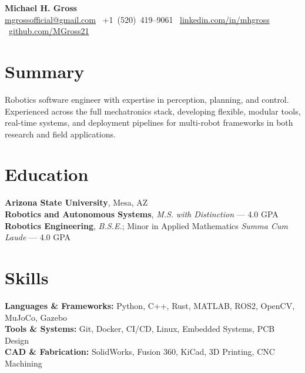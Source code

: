 \documentclass[10pt]{article}
\begin{document}

\begin{center}
    {\LARGE \textbf{Michael H. Gross}} \\
    \href{mailto:mgrossofficial@gmail.com}{mgrossofficial@gmail.com} \textbar\ +1~(520)~419--9061 \textbar\ 
    \href{https://www.linkedin.com/in/mhgross}{linkedin.com/in/mhgross} \textbar\ \href{https://github.com/MGross21}{github.com/MGross21}
\end{center}

\section*{Summary}
Robotics software engineer with expertise in perception, planning, and control. Experienced across the full mechatronics stack, developing flexible, modular tools, real-time systems, and deployment pipelines for multi-robot frameworks in both research and field applications. %

\section*{Education}
\textbf{Arizona State University}, Mesa, AZ \\
\textbf{Robotics and Autonomous Systems}, \textit{M.S.} \hfill \textit{with Distinction} --- 4.0 GPA \\
\textbf{Robotics Engineering}, \textit{B.S.E.}; Minor in Applied Mathematics \hfill \textit{Summa Cum Laude} --- 4.0 GPA

\section*{Skills}
\textbf{Languages \& Frameworks:} Python, C++, Rust, MATLAB, ROS2, OpenCV, MuJoCo, Gazebo \\
\textbf{Tools \& Systems:} Git, Docker, CI/CD, Linux, Embedded Systems, PCB Design \\
\textbf{CAD \& Fabrication:} SolidWorks, Fusion 360, KiCad, 3D Printing, CNC Machining
\end{document}
